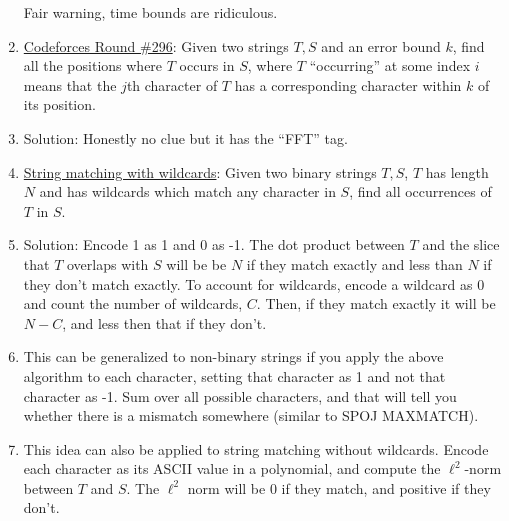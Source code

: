 \documentclass[11pt,handout]{beamer}             %
\begin{document}
\begin{frame}
\begin{enumerate}
    Fair warning, time bounds are ridiculous.

  \item \href{https://codeforces.com/contest/528/problem/D}
    {Codeforces Round \#296}: Given two strings \( T, S \) and 
    an error bound \( k \), find all the positions where \( T \) occurs
    in \( S \), where \( T \) \enquote{occurring} at some index \( i \) 
    means that the \( j \)th character of \( T \) has a corresponding character
    within \( k \) of its position.
    \addtocounter{enumi}{-1}
  \item Solution: Honestly no clue but it has the \enquote{FFT} tag.

  \item \href{https://cs.stanford.edu/~rishig/courses/ref/l17.txt}
    {String matching with wildcards}: Given two binary strings \( T, S \),
    \( T \) has length \( N \) and has wildcards which match any character
    in \( S \), find all occurrences of \( T \) in \( S \).
    \addtocounter{enumi}{-1}
  \item Solution: Encode 1 as 1 and 0 as -1. The dot product between \( T \)
    and the slice that \( T \) overlaps with \( S \) will be be \( N \)
    if they match exactly and less than \( N \) if they don't match exactly.
    To account for wildcards, encode a wildcard as \( 0 \) and count the
    number of wildcards, \( C \). Then, if they match exactly it will be
    \( N - C \), and less then that if they don't.
    \addtocounter{enumi}{-1}
  \item This can be generalized to non-binary strings if you apply the above
    algorithm to each character, setting that character as 1 and not that
    character as -1. Sum over all possible characters, and that will tell you
    whether there is a mismatch somewhere (similar to SPOJ MAXMATCH).
    \addtocounter{enumi}{-1}
  \item This idea can also be applied to string matching without wildcards.
    Encode each character as its ASCII value in a polynomial, and compute
    the \( \ell^2 \)-norm between \( T \) and \( S \). The \( \ell^2 \) norm
    will be 0 if they match, and positive if they don't.


\end{enumerate}
\end{frame}
\end{document}
